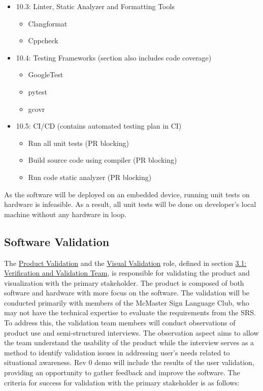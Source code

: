 \documentclass[12pt, titlepage]{article}
\begin{document}
\begin{itemize}
  \item 10.3: Linter, Static Analyzer and Formatting Tools
  \begin{itemize}
    \item Clangformat \cite{ClangFormat}
    \item Cppcheck \cite{Cppcheck}
  \end{itemize}
  \item 10.4: Testing Frameworks (section also includes code coverage)
  \begin{itemize}
    \item GoogleTest \cite{GoogleTest}
    \item pytest \cite{pytest}
    \item gcovr \cite{gcovr}
  \end{itemize}
  \item 10.5: CI/CD (contains automated testing plan in CI)
  \begin{itemize}
    \item Run all unit tests (PR blocking)
    \item Build source code using compiler (PR blocking)
    \item Run code static analyzer (PR blocking)
  \end{itemize}
\end{itemize}

As the software will be deployed on an embedded device, running unit tests on
hardware is infeasible. As a result, all unit tests will be done on developer's
local machine without any hardware in loop.

\subsection{Software Validation}\label{sec:software_validation}

The \hyperref[role:product_validation]{Product Validation} and 
the \hyperref[role:visual_vnv]{Visual Validation} role, defined in
section \hyperref[sec:vnv_team]{3.1: Verification and Validation Team}, is
responsible for validating the product and visualization with the primary
stakeholder. The product
is composed of both software and hardware with more focus on the software. The
validation will be conducted primarily with members of the McMaster Sign
Language Club, who may not have the technical expertise to evaluate the
requirements from the SRS. To address this, the validation team members
will conduct observations of product use and semi-structured interviews.
The observation aspect aims to allow the team understand the usability of the
product while the interview serves as a method to identify validation issues
in addressing user's needs related to situational awareness. Rev 0 demo will
include the results of the user validation, providing an opportunity to gather
feedback and improve the software.
\newline
\newline
The criteria for success for validation with the primary stakeholder is as
follows:
\end{document}
